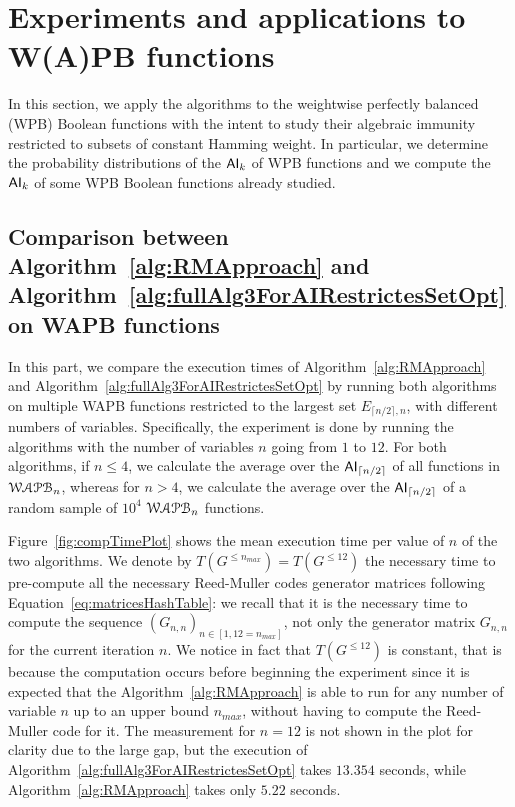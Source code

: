 \documentclass[11pt]{llncs}
\begin{document}
\section{Experiments and applications to W(A)PB functions}
In this section, we apply the algorithms to the weightwise perfectly balanced (WPB) Boolean functions with the intent to study their algebraic immunity restricted to subsets of constant Hamming weight. In particular, we determine the probability distributions of the $\mathsf{AI}_{k}$ of WPB functions and we compute the $\mathsf{AI}_{k}$ of some WPB Boolean functions already studied.

\subsection{Comparison between Algorithm~\ref{alg:RMApproach} and Algorithm~\ref{alg:fullAlg3ForAIRestrictesSetOpt} on WAPB functions}
In this part, we compare the execution times of Algorithm~\ref{alg:RMApproach} and Algorithm~\ref{alg:fullAlg3ForAIRestrictesSetOpt} by running both algorithms on multiple WAPB functions restricted to the largest set $E_{\lceil{n/2}\rceil,n}$, with different numbers of variables. 
Specifically, the experiment is done by running the algorithms with the number of variables $n$ going from $1$ to $12$. For both algorithms, if $n \leq 4$, we calculate the average over the $\mathsf{AI}_{\lceil{n/2}\rceil}$ of all functions in $\mathcal{WAPB}_{n}$, whereas for $n > 4$, we calculate the average over the $\mathsf{AI}_{\lceil{n/2}\rceil}$ of a random sample of $10^4$ $\mathcal{WAPB}_{n}$ functions.

Figure~\ref{fig:compTimePlot} shows the mean execution time per value of $n$ of the two algorithms.
We denote by $T\left(G^{\leq n_{max}}\right) = T\left(G^{\leq 12} \right)$ the necessary time to pre-compute all the necessary Reed-Muller codes generator matrices following Equation~\eqref{eq:matricesHashTable}: we recall that it is the necessary time to compute the sequence $\left(G_{n,n}\right)_{n\in [1,12=n_{max}]}$, not only the generator matrix $G_{n,n}$ for the current iteration $n$. 
We notice in fact that $T\left(G^{\leq 12}\right)$ is constant, that is because the computation occurs before beginning the experiment since it is expected that the Algorithm~\ref{alg:RMApproach} is able to run for any number of variable $n$ up to an upper bound $n_{max}$, without having to compute the Reed-Muller code for it. 
The measurement for $n = 12$ is not shown in the plot for clarity due to the large gap, but the execution of Algorithm~\ref{alg:fullAlg3ForAIRestrictesSetOpt} takes $13.354$ seconds, while Algorithm~\ref{alg:RMApproach} takes only $5.22$ seconds.
\end{document}
